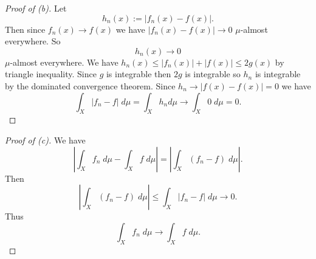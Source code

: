 \begin{proof}[Proof of (b)]
    Let 
    \[
        h_n(x) := |f_n(x) - f(x)|. 
    \]
    Then since $f_n(x) \to f(x)$ we have 
    $|f_n(x) - f(x)| \to 0$ $\mu$-almost everywhere. So 
    \[
        h_n(x) \to 0
    \]
    $\mu$-almost everywhere. 
    We have $h_n(x) \leq |f_n(x)| + |f(x)| \leq 2g(x)$ by triangle 
    inequality. Since $g$ is integrable then $2g$ is integrable 
    so $h_n$ is integrable by the dominated convergence 
    theorem. Since $h_n \to |f(x) - f(x)| = 0$ we have 
    \[
        \int_X |f_n - f| \; d\mu = \int_X h_n d\mu \to 
        \int_X 0 \; d\mu = 0.
    \]
\end{proof}

\begin{proof}[Proof of (c)]
    We have 
    \[
        \left| \int_X f_n\; d\mu - \int_X f \; d\mu \right| 
        = \left|\int_X (f_n - f) \; d\mu\right|. 
    \]
    Then 
    \[
        \left|\int_X (f_n - f) \; d\mu\right|
        \leq 
        \int_X |f_n - f| \; d\mu \to 0. 
    \]
    Thus 
    \[
        \int_X f_n \; d\mu \to \int_X f \; d\mu.
    \]
\end{proof}


